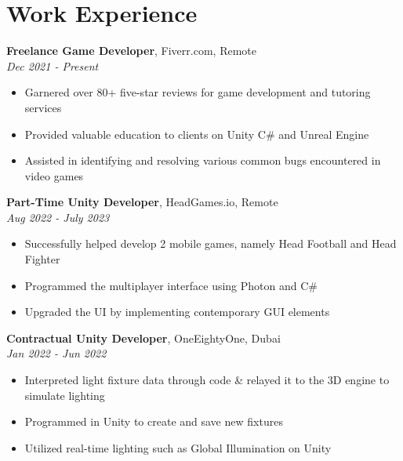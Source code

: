 \documentclass[a4paper,10pt]{article}
\begin{document}
\section*{Work Experience}

\textbf{Freelance Game Developer}, Fiverr.com, Remote \\

\textit{Dec 2021 - Present}

\begin{itemize}

    \item Garnered over 80+ five-star reviews for game development and tutoring services
    \item Provided valuable education to clients on Unity C\# and Unreal Engine
    \item Assisted in identifying and resolving various common bugs encountered in video games

\end{itemize}

\textbf{Part-Time Unity Developer}, HeadGames.io, Remote \\
\textit{Aug 2022 - July 2023}

\begin{itemize}

    \item Successfully helped develop 2 mobile games, namely Head Football and Head Fighter
    \item Programmed the multiplayer interface using Photon and C\#
    \item Upgraded the UI by implementing contemporary GUI elements

\end{itemize}

\textbf{Contractual Unity Developer}, OneEightyOne, Dubai \\

\textit{Jan 2022 - Jun 2022}

\begin{itemize}

    \item Interpreted light fixture data through code \& relayed it to the 3D engine to simulate lighting
    \item Programmed in Unity to create and save new fixtures
    
    \item Utilized real-time lighting such as Global Illumination on Unity

\end{itemize}
\end{document}
